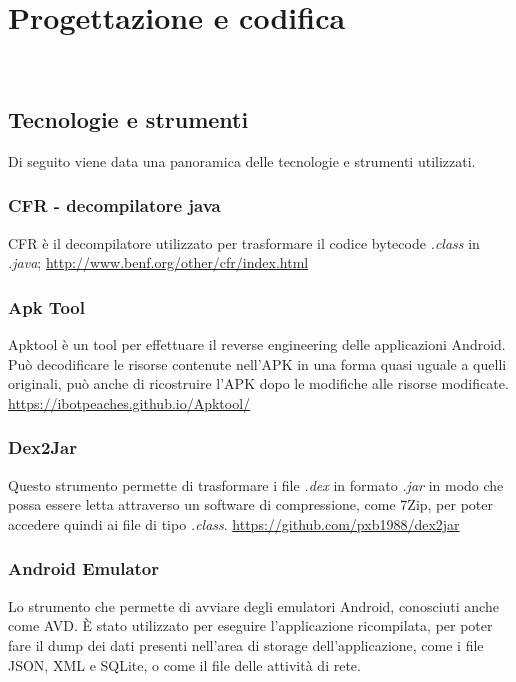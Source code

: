 
\chapter{Progettazione e codifica}
\label{ch:progettazione-e-codifica}

\\

\section{Tecnologie e strumenti}
\label{sec:tecnologie-strumenti}

Di seguito viene data una panoramica delle tecnologie e strumenti utilizzati.

\subsection*{CFR - decompilatore java}
CFR è il decompilatore utilizzato per trasformare il codice bytecode \textit{.class} in \textit{.java};
\url{http://www.benf.org/other/cfr/index.html}

\subsection*{Apk Tool}
Apktool è un tool per effettuare il reverse engineering delle applicazioni Android. Può decodificare le risorse contenute nell'APK in una forma quasi uguale a quelli originali, può anche di ricostruire l'APK dopo le modifiche alle risorse modificate.
\url{https://ibotpeaches.github.io/Apktool/}
\subsection*{Dex2Jar}
Questo strumento permette di trasformare i file \textit{.dex} in formato \textit{.jar} in modo che possa essere letta attraverso un software di compressione, come 7Zip, per poter accedere quindi ai file di tipo \textit{.class}.
\url{https://github.com/pxb1988/dex2jar}

\subsection*{Android Emulator}
Lo strumento che permette di avviare degli emulatori Android, conosciuti anche come AVD. \`{E} stato utilizzato per eseguire l'applicazione ricompilata, per poter fare il dump dei dati presenti nell'area di storage dell'applicazione, come i file JSON, XML e SQLite, o come il file delle attività di rete.

